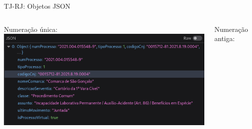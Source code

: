 \begin{frame}{TJ-RJ: Objetos JSON}
    \vspace{-3em}
    \begin{columns}
        \begin{column}{0.5\textwidth}
            \begin{center}
                Numeração única:
                \includegraphics[keepaspectratio,width=1\textwidth]{img/tj-rj-ww3-resposta-unica-campos}
            \end{center}
        \end{column}
        \begin{column}{0.5\textwidth}
            \begin{center}
                Numeração antiga:

\end{center}
\end{column}
\end{columns}
\end{frame}
